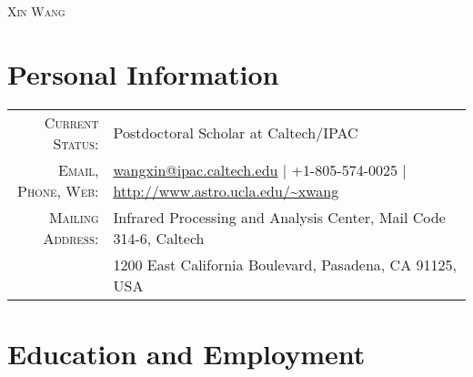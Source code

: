 \documentclass[letterpaper,10pt]{article}
\begin{document}
\par{\centering
  {\Large \textsc{Xin Wang}}
\par}

\section{Personal Information}
\begin{tabular}{rl}
    \textsc{Current Status:}  & Postdoctoral Scholar at Caltech/IPAC    \\
    \textsc{Email, Phone, Web:}  & \href{mailto:wangxin@ipac.caltech.edu}{wangxin@ipac.caltech.edu}     |  +1-805-574-0025  |  \url{http://www.astro.ucla.edu/~xwang}\\
    \textsc{Mailing Address:} & Infrared Processing and Analysis Center, Mail Code 314-6, Caltech \\
                              & 1200 East California Boulevard, Pasadena, CA 91125, USA
\end{tabular}


\section{Education and Employment}
\end{document}
